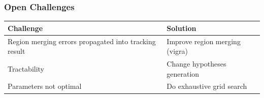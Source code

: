 \begin{frame}
    \frametitle{Open Challenges}
    \renewcommand{\arraystretch}{1.5}
    \begin{tabularx}{\textwidth}{X|X}
        Challenge & Solution \\ \hline
        Region merging errors propagated into tracking result  & Improve region merging (vigra) \\
        Tractability & Change hypotheses generation \\
        Parameters not optimal & Do exhaustive grid search \\
    \end{tabularx}
\end{frame}


